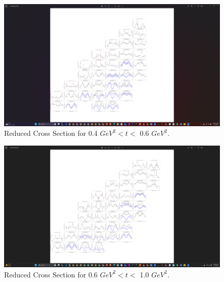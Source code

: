 \begin{figure}[ht]
\centering
\includegraphics[trim={14.6cm 4cm 23cm 4cm},clip,width=\textwidth]{Chapters/Ch4-BaseAnalysis/bin_by_bin_cross_sections/pics_screenshots/t_4.png}
\caption[Reduced Cross Section for 0.4 $GeV^2 < t <$ 0.6 $GeV^2$]{Reduced Cross Section for 0.4 $GeV^2 < t <$ 0.6 $GeV^2$.}
\label{fig:combined_t0.4}
\end{figure}


\begin{figure}[ht]
    \centering
    \includegraphics[trim={14.8cm 4cm 18.5cm 4cm},clip,width=\textwidth]{Chapters/Ch4-BaseAnalysis/bin_by_bin_cross_sections/pics_screenshots/t_6.png}
    \caption[Reduced Cross Section for 0.6 $GeV^2 < t <$ 1.0 $GeV^2$]{Reduced Cross Section for 0.6 $GeV^2 < t <$ 1.0 $GeV^2$.}
    \label{fig:combined_t0.6}
\end{figure}


